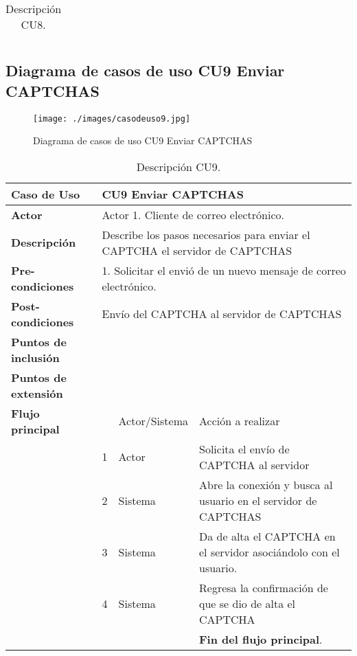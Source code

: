 \documentclass[12pt,oneside,onecolumn,openany]{report}
\begin{document}
\begin{table}[H]
{\begin{tabular}{| p{} | p{} |p{4cm}|p{5cm}|}
     \end{tabular}
    }
    \caption{Descripción CU8.}
    \label{tabla:CU8}
\end{table}


\pagebreak
\subsection{Diagrama de casos de uso CU9 Enviar CAPTCHAS}
\begin{figure}[H]
	\texttt{[image: ./images/casodeuso9.jpg]}
	\caption{Diagrama de casos de uso CU9 Enviar CAPTCHAS}
	\label{fig:4-10-1}
\end{figure}

\begin{table}[H]
 \centering
   {
     \begin{tabular}{| p{} | p{} |p{4cm}|p{5cm}|}
     \hline
     \textbf{Caso de Uso} &\multicolumn{3}{|l|}{CU9 Enviar CAPTCHAS}\\
     \hline
     \textbf{Actor} & \multicolumn{3}{|l|}{Actor 1. Cliente de correo electrónico.}\\
     \hline
     \textbf{Descripción} & \multicolumn{3}{|p{10cm}|}{Describe los pasos necesarios para enviar el CAPTCHA el servidor de CAPTCHAS}\\
     \hline
     \textbf{Pre-condiciones} & \multicolumn{3}{|l|}{1. Solicitar el envió de un nuevo mensaje de correo electrónico.}\\
     \hline
     \textbf{Post-condiciones} & \multicolumn{3}{|l|}{Envío del CAPTCHA al servidor de CAPTCHAS}\\
     \hline
     \textbf{Puntos de inclusión} & \multicolumn{3}{|l|}{}\\
     \hline
     \textbf{Puntos de extensión} & \multicolumn{3}{|l|}{}\\
     \hline
     \textbf{Flujo principal} & & Actor/Sistema & Acción a realizar\\
     \hline
     & 1 & Actor & Solicita el envío de CAPTCHA al servidor\\
     \hline
     & 2 & Sistema & Abre la conexión y busca al usuario en el servidor de CAPTCHAS\\
     \hline
     & 3 & Sistema & Da de alta el CAPTCHA en el servidor asociándolo con el usuario.\\
     \hline
     & 4 & Sistema & Regresa la confirmación de que se dio de alta el CAPTCHA\\
     \hline
     & & & \textbf{Fin del flujo principal}.\\
         
     \end{tabular}
    }
    \caption{Descripción CU9.}
    \label{tabla:CU9}
\end{table}
\end{document}
